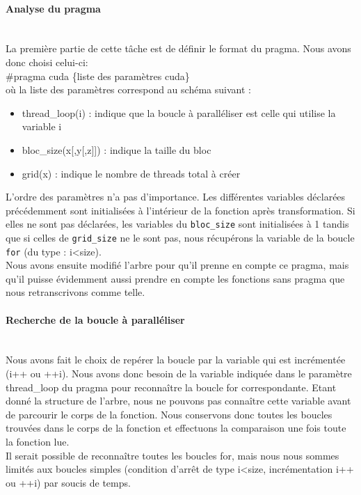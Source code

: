 \documentclass{article}
\begin{document}
	\paragraph{Analyse du pragma}
	~~\\
	\indent
	La première partie de cette tâche est de définir le format du pragma. Nous avons donc choisi celui-ci:
	\\\#pragma cuda \{liste des paramètres cuda\}
	\\où la liste des paramètres correspond au schéma suivant :
	\begin{itemize}
		\item thread\_loop(i) : indique que la boucle à paralléliser est celle qui utilise la variable i
		\item bloc\_size(x[,y[,z]]) : indique la taille du bloc
		\item grid(x) : indique le nombre de threads total à créer
	\end{itemize}
	L'ordre des paramètres n'a pas d'importance.
	Les différentes variables déclarées précédemment sont initialisées à l'intérieur de la fonction après transformation.
	Si elles ne sont pas déclarées, les variables du \verb|bloc_size| sont initialisées à 1 tandis que si celles de \verb|grid_size| ne le sont pas, nous récupérons la variable de la boucle \verb|for| (du type : i<size).
	\\Nous avons ensuite modifié l'arbre pour qu'il prenne en compte ce pragma, mais qu'il puisse évidemment aussi prendre en compte les fonctions sans pragma que nous retranscrivons comme telle.
	
	
	\paragraph{Recherche de la boucle à paralléliser}
	~~\\
	\indent
	Nous avons fait le choix de repérer la boucle par la variable qui est incrémentée (i++ ou ++i). Nous avons donc besoin de la variable indiquée dans le paramètre thread\_loop du pragma pour reconnaître la boucle for correspondante. Etant donné la structure de l'arbre, nous ne pouvons pas connaître cette variable avant de parcourir le corps de la fonction. Nous conservons donc toutes les boucles trouvées dans le corps de la fonction et effectuons la comparaison une fois toute la fonction lue.
	\\Il serait possible de reconnaître toutes les boucles for, mais nous nous sommes limités aux boucles simples (condition d'arrêt de type i<size, incrémentation i++ ou ++i) par soucis de temps.
	
\end{document}
